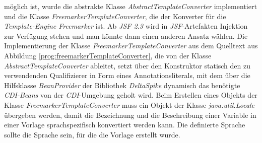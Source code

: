 möglich ist, wurde die abstrakte Klasse \emph{AbstractTemplateConverter} implementiert und die Klasse \emph{FreemarkerTemplateConverter}, die der Konverter für die \emph{Template-Engine Freemarker} ist. Ab \emph{JSF 2.3} wird in \emph{JSF}-Artefakten Injektion zur Verfügung stehen und man könnte dann einen anderen Ansatz wählen. Die Implementierung der Klasse \emph{FreemarkerTemplateConverter} aus dem Quelltext aus Abbildung \ref{prog:freemarkerTemplateConverter}, die von der Klasse \emph{AbstractTemplateConverter} ableitet, setzt über den Konstruktor statisch den zu verwendenden Qualifizierer in Form eines Annotationsliterals, mit dem über die Hilfsklasse \emph{BeanProvider} der Bibliothek \emph{DeltaSpike} dynamisch das benötigte \emph{CDI-Beans} von der \emph{CDI}-Umgebung geholt wird. Beim Erstellen eines Objekts der Klasse \emph{FreemarkerTemplateConverter} muss ein Objekt der Klasse \emph{java.util.Locale} übergeben werden, damit die Bezeichnung und die Beschreibung einer Variable in einer Vorlage sprachspezifisch konvertiert werden kann. Die definierte Sprache sollte die Sprache sein, für die die Vorlage erstellt wurde.
\newpage

